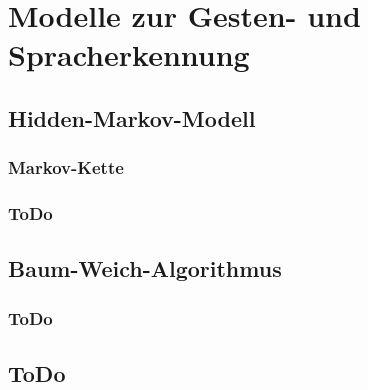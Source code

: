 \chapter{Modelle zur Gesten- und Spracherkennung}
\label{chap:Modelle}

\section{Hidden-Markov-Modell}
\subsection{Markov-Kette}
\label{subsec:MarkovKette}

\subsection{ToDo}

\section{Baum-Weich-Algorithmus}

\subsection{ToDo}

\section{ToDo}

